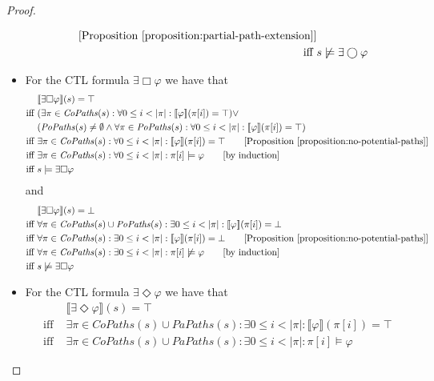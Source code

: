 \documentclass[12pt]{article}
\newcommand{\always}{\Box}
\newcommand{\eventually}{\Diamond}
\newcommand{\nxt}{\bigcirc}
\theoremstyle{definition}
\newcommand{\comment}[1]{\hspace{2em}[\mbox{#1}]}
\newcommand{\satisfaction}[1]{\llbracket #1 \rrbracket}
\newcommand{\bottom}{\mathord{\perp}}
\begin{document}
\begin{proof}
\begin{itemize}
\begin{align*}
\comment{Proposition~\ref{proposition:partial-path-extension}}\\
\mbox{iff } & s \not\models \exists \nxt \varphi
\end{align*}
\item
For the CTL formula $\exists \always \varphi$ we have that
\begin{align*}
& \satisfaction{\exists \always \varphi}(s) = \top\\
\mbox{iff } & (\exists \pi \in \mathit{CoPaths}(s) : \forall 0 \leq i < |\pi| : \satisfaction{\varphi}(\pi[i]) = \top) \vee\\
& (\mathit{PoPaths}(s) \not= \emptyset \wedge \forall \pi \in \mathit{PoPaths}(s) : \forall 0 \leq i < |\pi| : \satisfaction{\varphi}(\pi[i]) = \top)\\
\mbox{iff } & \exists \pi \in \mathit{CoPaths}(s) : \forall 0 \leq i < |\pi| : \satisfaction{\varphi}(\pi[i]) = \top
\comment{Proposition~\ref{proposition:no-potential-paths}}\\
\mbox{iff } & \exists \pi \in \mathit{CoPaths}(s) : \forall 0 \leq i < |\pi| : \pi[i] \models \varphi
\comment{by induction}\\
\mbox{iff } & s \models \exists \always \varphi
\end{align*}
and
\begin{align*}
& \satisfaction{\exists \always \varphi}(s) = \bottom\\
\mbox{iff } & \forall \pi \in \mathit{CoPaths}(s) \cup \mathit{PoPaths}(s) : \exists 0 \leq i < |\pi| : \satisfaction{\varphi}(\pi[i]) = \bottom\\
\mbox{iff } & \forall \pi \in \mathit{CoPaths}(s) : \exists 0 \leq i < |\pi| : \satisfaction{\varphi}(\pi[i]) = \bottom
\comment{Proposition~\ref{proposition:no-potential-paths}}\\
\mbox{iff } & \forall \pi \in \mathit{CoPaths}(s) : \exists 0 \leq i < |\pi| : \pi[i] \not\models \varphi \comment{by induction}\\
\mbox{iff } & s \not\models \exists \always \varphi
\end{align*}
\item
For the CTL formula $\exists \eventually \varphi$ we have that
\begin{align*}
& \satisfaction{\exists \eventually \varphi}(s) = \top\\
\mbox{iff } & \exists \pi \in \mathit{CoPaths}(s) \cup \mathit{PaPaths}(s) : \exists 0 \leq i < |\pi| : \satisfaction{\varphi}(\pi[i]) = \top\\
\mbox{iff } & \exists \pi \in \mathit{CoPaths}(s) \cup \mathit{PaPaths}(s) : \exists 0 \leq i < |\pi| : \pi[i] \models \varphi

\end{align*}
\end{itemize}
\end{proof}
\end{document}
